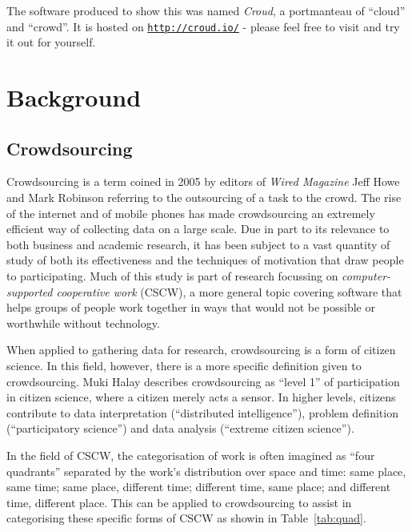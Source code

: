 \documentclass{article}
\begin{document}
		The software produced to show this was named \emph{Croud}, a portmanteau of ``cloud'' and ``crowd''. It is hosted on \href{http://croud.io/}{\nolinkurl{http://croud.io/}} - please feel free to visit and try it out for yourself.

	\section{Background}
	\label{sec:background}
		\subsection{Crowdsourcing}
		Crowdsourcing is a term coined in 2005 by editors of \emph{Wired Magazine} Jeff Howe and Mark Robinson\cite{safire_fat_2009} referring to the outsourcing of a task to the crowd. The rise of the internet and of mobile phones has made crowdsourcing an extremely efficient way of collecting data on a large scale. Due in part to its relevance to both business and academic research, it has been subject to a vast quantity of study of both its effectiveness\cite{brabham_effectiveness_2010} and the techniques of motivation that draw people to participating\cite{hossain_users_2012}. Much of this study is part of research focussing on \emph{computer-supported cooperative work} (CSCW), a more general topic covering software that helps groups of people work together in ways that would not be possible or worthwhile without technology.

		When applied to gathering data for research, crowdsourcing is a form of citizen science\cite{_citizen_2015}. In this field, however, there is a more specific definition given to crowdsourcing. Muki Halay describes crowdsourcing as ``level 1'' of participation in citizen science, where a citizen merely acts a sensor. In higher levels, citizens contribute to data interpretation (``distributed intelligence''), problem definition (``participatory science'') and data analysis (``extreme citizen science'')\cite{haklay_citizen_2013}.

		In the field of CSCW, the categorisation of work is often imagined as ``four quadrants''\cite{johansen_groupware:_1988} separated by the work's distribution over space and time: same place, same time; same place, different time; different time, same place; and different time, different place. This can be applied to crowdsourcing to assist in categorising these specific forms of CSCW as showin in Table~\ref{tab:quad}\cite{erickson_geocentric_2010}.
\end{document}

